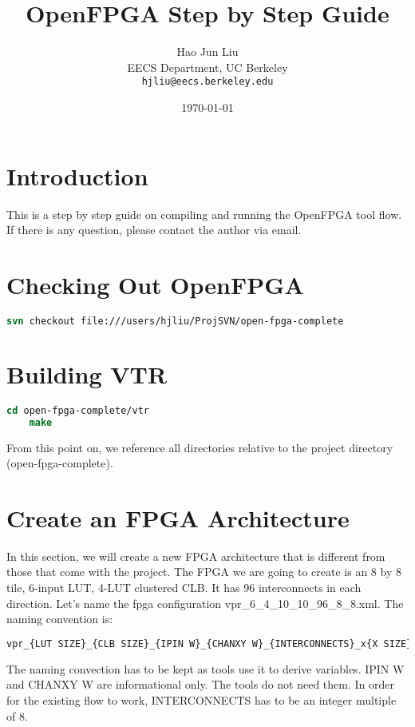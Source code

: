 \documentclass[10pt]{article}
\title{OpenFPGA Step by Step Guide}
\author{Hao Jun Liu\\
EECS Department, UC Berkeley\\
{\tt  hjliu@eecs.berkeley.edu}
}
\date{\today}
\begin{document}
\maketitle{}

\section{Introduction}

This is a step by step guide on compiling and running the OpenFPGA tool flow. If there is any question, please contact
the author via email.

\section{Checking Out OpenFPGA}
\begin{lstlisting}[language=csh]
    svn checkout file:///users/hjliu/ProjSVN/open-fpga-complete
\end{lstlisting}

\section{Building VTR}
\begin{lstlisting}[language=csh]
    cd open-fpga-complete/vtr
    make
\end{lstlisting}

\noindent
From this point on, we reference all directories relative to the project directory (open-fpga-complete).
\newline

\section{Create an FPGA Architecture}

In this section, we will create a new FPGA architecture that is different from those that come with the project.
The FPGA we are going to create is an 8 by 8 tile, 6-input LUT, 4-LUT clustered CLB. It has 96 interconnects 
in each direction. Let's name the fpga configuration vpr\_6\_4\_10\_10\_96\_8\_8.xml. The naming convention is:


\begin{lstlisting}[language=csh]
    vpr_{LUT SIZE}_{CLB SIZE}_{IPIN W}_{CHANXY W}_{INTERCONNECTS}_x{X SIZE}_y{Y SIZE}.xml 
\end{lstlisting}  

\noindent    
The naming convection has to be kept as tools use it to derive variables. IPIN W and CHANXY W are informational only.
The tools do not need them. In order for the existing flow to work, INTERCONNECTS has to be an integer multiple of 8.
\end{document}
